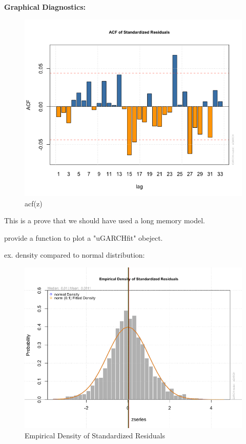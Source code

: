\documentclass[a4paper, 11pt]{article}
\begin{document}
\textbf{Graphical Diagnostics:}\par
\begin{figure}[H]
\centering
\caption{acf(z)}
\includegraphics[scale=.60]{zacf.png}
\end{figure}
This is a prove that we should have used a long memory model.\par 


 provide a function to plot a "uGARCHfit" obeject.\par
ex. density compared to normal distribution:
\begin{figure}[H]
\centering
\caption{Empirical Density of Standardized Residuals}
\includegraphics[scale=.60]{density.png}
\end{figure}
 
\end{document}

